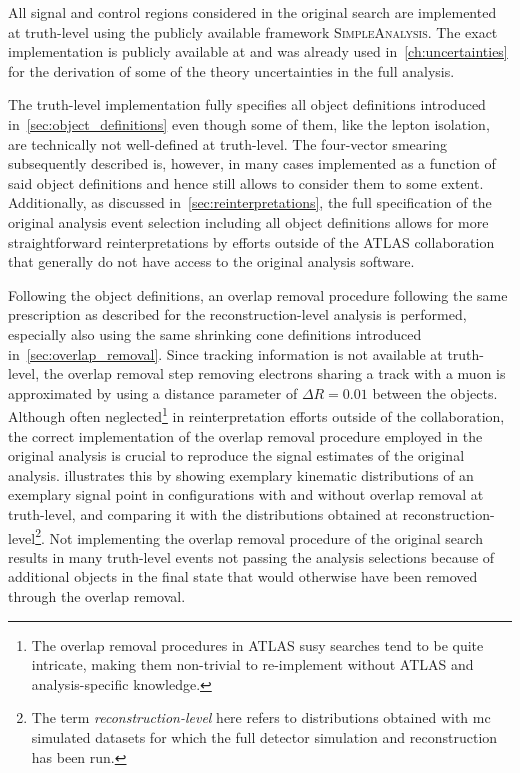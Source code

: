 All signal and control regions considered in the original \onelepton search are implemented at truth-level using the publicly available framework \textsc{SimpleAnalysis}. The exact implementation is publicly available at \cite{HEPdata_1Lbb} and was already used in~\cref{ch:uncertainties} for the derivation of some of the theory uncertainties in the full analysis.

The truth-level implementation fully specifies all object definitions introduced in~\cref{sec:object_definitions} even though some of them, like the lepton isolation, are technically not well-defined at truth-level. The four-vector smearing subsequently described is, however, in many cases implemented as a function of said object definitions and hence still allows to consider them to some extent. Additionally, as discussed in~\cref{sec:reinterpretations}, the full specification of the original analysis event selection including all object definitions allows for more straightforward reinterpretations by efforts outside of the ATLAS collaboration that generally do not have access to the original analysis software.

Following the object definitions, an overlap removal procedure following the same prescription as described for the reconstruction-level analysis is performed, \ie especially also using the same shrinking cone definitions introduced in~\cref{sec:overlap_removal}. Since tracking information is not available at truth-level, the overlap removal step removing electrons sharing a track with a muon is approximated by using a distance parameter of $\Delta R = 0.01$ between the objects. Although often neglected\footnote{The overlap removal procedures in ATLAS \gls{susy} searches tend to be quite intricate, making them non-trivial to re-implement without ATLAS and analysis-specific knowledge.} in reinterpretation efforts outside of the collaboration, the correct implementation of the overlap removal procedure employed in the original analysis is crucial to reproduce the signal estimates of the original analysis.
 illustrates this by showing exemplary kinematic distributions of an exemplary signal point in configurations with and without overlap removal at truth-level, and comparing it with the distributions obtained at reconstruction-level\footnote{The term \textit{reconstruction-level} here refers to distributions obtained with \gls{mc} simulated datasets for which the full detector simulation and reconstruction has been run.}.
Not implementing the overlap removal procedure of the original \onelepton search results in many truth-level events not passing the analysis selections because of additional objects in the final state that would otherwise have been removed through the overlap removal. 


